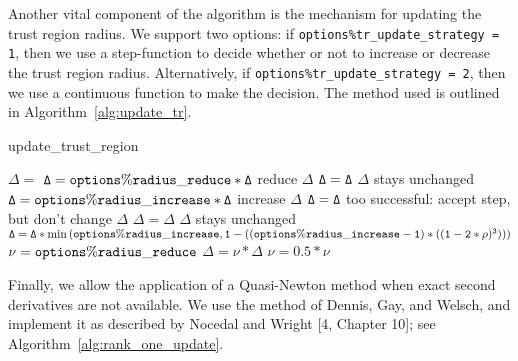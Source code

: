 Another vital component of the algorithm is the mechanism for updating the trust region radius.  We support two options: if {\tt options\%tr\_update\_strategy = 1}, then we use a step-function to 
  decide whether or not to increase or decrease the trust region radius.  Alternatively, if
{\tt options\%tr\_update\_strategy = 2}, then we use a continuous function to make the 
decision.  The method used is outlined in Algorithm~\ref{alg:update_tr}.

\begin{algorithm}
\caption{update\_trust\_region}
\label{alg:update_tr}
\begin{algorithmic}[1]    
   $\Delta = $ 
      \State $\tt \Delta = options\%radius\_reduce * \Delta$
      \Comment reduce $\Delta$
      \State $\tt \Delta = \Delta$
      \Comment $\Delta$ stays unchanged
      \State $\tt \Delta = options\%radius\_increase * \Delta$
      \Comment increase $\Delta$
      \State $\tt \Delta = \Delta$
      \Comment too successful: accept step, but don't change $\Delta$
      \EndIf
    \State [on first call, set $\nu = 2.0$]
        \State $\Delta = \Delta$
        \Comment $\Delta$ stays unchanged
        \State $\tt \Delta = \Delta * \min\left(options\%radius\_increase,  
          1 - \left( (options\%radius\_increase -1)*((1 - 2*\rho)^3)  \right)\right)$
        \State $\tt \nu = options\%radius\_reduce$
        \State $ \Delta = \nu * \Delta$
        \State $ \nu = 0.5 * \nu$
      \EndIf
    \EndIf
  \end{algorithmic}
\end{algorithm}

Finally, we allow the application of a Quasi-Newton method when exact second derivatives are not available.  We use the method of Dennis, Gay, and Welsch, and implement it as described by Nocedal and Wright [4, Chapter 10]; see Algorithm~\ref{alg:rank_one_update}.

